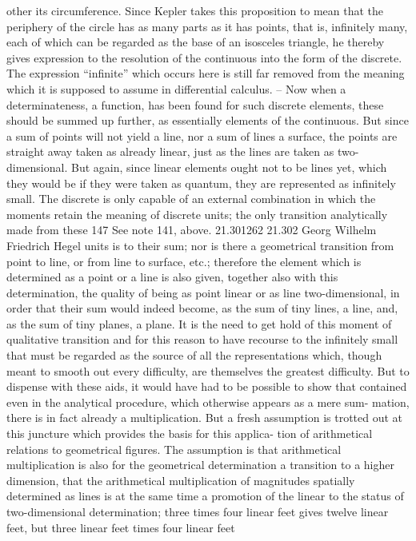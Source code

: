other its circumference. Since Kepler takes this proposition to mean that
the periphery of the circle has as many parts as it has points, that is, infinitely
many, each of which can be regarded as the base of an isosceles triangle,
he thereby gives expression to the resolution of the continuous into the
form of the discrete. The expression “infinite” which occurs here is still far
removed from the meaning which it is supposed to assume in differential
calculus. – Now when a determinateness, a function, has been found for
such discrete elements, these should be summed up further, as essentially
elements of the continuous. But since a sum of points will not yield a
line, nor a sum of lines a surface, the points are straight away taken as
already linear, just as the lines are taken as two-dimensional. But again,
since linear elements ought not to be lines yet, which they would be if they
were taken as quantum, they are represented as infinitely small. The discrete
is only capable of an external combination in which the moments retain the
meaning of discrete units; the only transition analytically made from these
147
See note 141, above.
21.301262
21.302
Georg Wilhelm Friedrich Hegel
units is to their sum; nor is there a geometrical transition from point to line,
or from line to surface, etc.; therefore the element which is determined as
a point or a line is also given, together also with this determination, the
quality of being as point linear or as line two-dimensional, in order that
their sum would indeed become, as the sum of tiny lines, a line, and, as
the sum of tiny planes, a plane.
It is the need to get hold of this moment of qualitative transition and
for this reason to have recourse to the infinitely small that must be regarded
as the source of all the representations which, though meant to smooth
out every difficulty, are themselves the greatest difficulty. But to dispense
with these aids, it would have had to be possible to show that contained
even in the analytical procedure, which otherwise appears as a mere sum-
mation, there is in fact already a multiplication. But a fresh assumption
is trotted out at this juncture which provides the basis for this applica-
tion of arithmetical relations to geometrical figures. The assumption is
that arithmetical multiplication is also for the geometrical determination
a transition to a higher dimension, that the arithmetical multiplication of
magnitudes spatially determined as lines is at the same time a promotion of
the linear to the status of two-dimensional determination; three times four
linear feet gives twelve linear feet, but three linear feet times four linear feet
